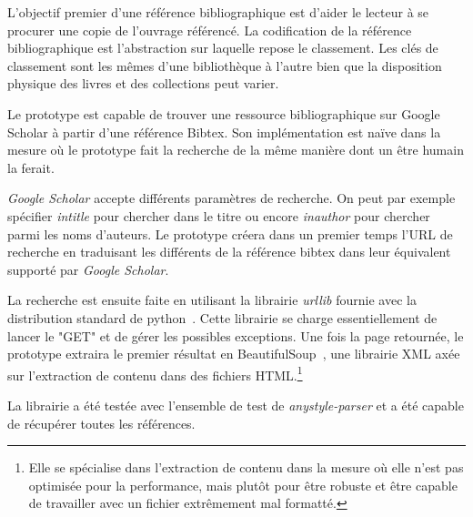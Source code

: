 L'objectif premier d'une référence bibliographique est d'aider le lecteur à se procurer une copie de l'ouvrage référencé. La codification de la référence bibliographique est l'abstraction sur laquelle repose le classement. Les clés de classement sont les mêmes d'une bibliothèque à l'autre bien que la disposition physique des livres et des collections peut varier.

Le prototype est capable de trouver une ressource bibliographique sur Google Scholar à partir d'une référence Bibtex. Son implémentation est naïve dans la mesure où le prototype fait la recherche de la même manière dont un être humain la ferait.

\emph{Google Scholar} accepte différents paramètres de recherche. On peut par exemple spécifier \emph{intitle} pour chercher dans le titre ou encore \emph{inauthor} pour chercher parmi les noms d'auteurs. Le prototype créera dans un premier temps l'URL de recherche en traduisant les différents de la référence bibtex dans leur équivalent supporté par \emph{Google Scholar}.

La recherche est ensuite faite en utilisant la librairie \emph{urllib} fournie avec la distribution standard de python~\cite{pythonorg}. Cette librairie se charge essentiellement de lancer le "GET" et de gérer les possibles exceptions. Une fois la page retournée, le prototype extraira le premier résultat en BeautifulSoup~\cite{beautifulsoup}, une librairie XML axée sur l'extraction de contenu dans des fichiers HTML.\footnote{Elle se spécialise dans l'extraction de contenu dans la mesure où elle n'est pas optimisée pour la performance, mais plutôt pour être robuste et être capable de travailler avec un fichier extrêmement mal formatté.}

La librairie a été testée avec l'ensemble de test de \emph{anystyle-parser} et a été capable de récupérer toutes les références.  
